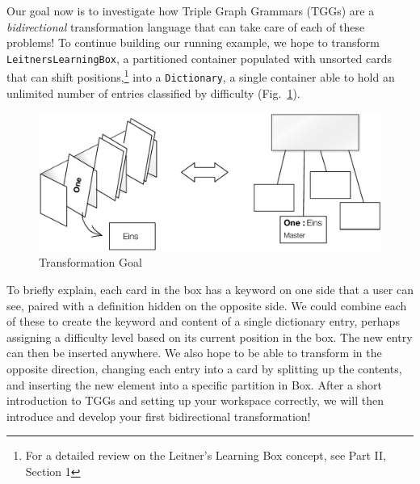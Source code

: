 Our goal now is to investigate how Triple Graph Grammars (TGGs) are a \emph{bidirectional} transformation language that can take care of each of these problems!
To continue building our running example, we hope to transform \texttt{LeitnersLearningBox}, a partitioned container populated with unsorted
cards that can shift positions,\footnote{For a detailed review on the Leitner's Learning Box concept, see Part II, Section 1} into a \texttt{Dictionary}, a
single container able to hold an unlimited number of entries classified by difficulty (Fig.~\ref{fig:transformIdea}). 

\vspace{0.5cm}

\begin{figure}[htbp]
\begin{center}
  \includegraphics[width=\textwidth]{TGGTransformationExample.pdf}
  \caption{Transformation Goal}
  \label{fig:transformIdea}
\end{center}
\end{figure}

To briefly explain, each card in the box has a keyword on one side that a user can see, paired with a definition hidden on the opposite side. We could combine
each of these to create the keyword and content of a single dictionary entry, perhaps assigning a difficulty level based on its current position in the
box. The new entry can then be inserted anywhere. We also hope to be able to transform in the opposite direction, changing each
entry into a card by splitting up the contents, and inserting the new element into a specific partition in Box. After a short introduction to TGGs and setting
up your workspace correctly, we will then introduce and develop your first bidirectional transformation!

